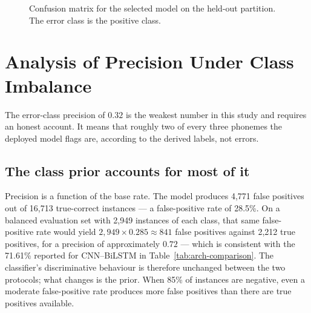 \begin{figure}[H]
\centering
{}
\caption[Confusion matrix]{Confusion matrix for the selected model on the
held-out partition. The error class is the positive class.}
\label{fig:confusion-matrix}
\end{figure}

\section{Analysis of Precision Under Class Imbalance}
\label{sec:res-imbalance}

The error-class precision of $0.32$ is the weakest number in this study and
requires an honest account. It means that roughly two of every three phonemes
the deployed model flags are, according to the derived labels, not errors.

\subsection{The class prior accounts for most of it}

Precision is a function of the base rate. The model produces 4{,}771 false
positives out of 16{,}713 true-correct instances --- a false-positive rate of
28.5\%. On a balanced evaluation set with 2{,}949 instances of each class, that
same false-positive rate would yield $2{,}949 \times 0.285 \approx 841$ false
positives against 2{,}212 true positives, for a precision of approximately
$0.72$ --- which is consistent with the 71.61\% reported for CNN--BiLSTM in
Table~\ref{tab:arch-comparison}. The classifier's discriminative behaviour is
therefore unchanged between the two protocols; what changes is the prior. When
85\% of instances are negative, even a moderate false-positive rate produces
more false positives than there are true positives available.

